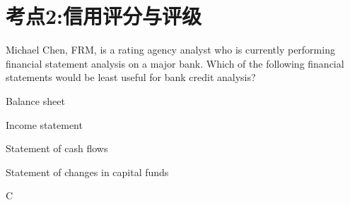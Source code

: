 \documentclass{article}
\newcounter{question} %
\begin{document}
\newpage



\section{考点2:信用评分与评级}
\setcounter{question}{0}

\begin{question}
    Michael Chen, FRM, is a rating agency analyst who is currently performing financial statement analysis on a major bank. Which of the following financial statements would be least useful for bank credit analysis?
\end{question}

\begin{choices}
    \item Balance sheet
    \item Income statement
    \item Statement of cash flows
    \item Statement of changes in capital funds
\end{choices}

\begin{correctanswer}
    C
\end{correctanswer}
\end{document}
